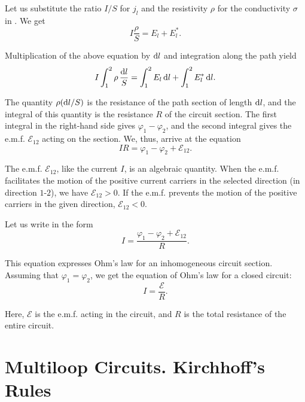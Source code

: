 Let us substitute the ratio $I/S$ for $j_l$ and the resistivity $\rho$ for the conductivity $\sigma$ in . We get
\begin{equation*}
    I \frac{\rho}{S} = E_l + E_l^*.
\end{equation*}

\noindent
Multiplication of the above equation by $\mathrm{d} l$ and integration along the path yield
\begin{equation*}
    I \int_1^2 \rho\, \frac{\mathrm{d} l}{S} = \int_1^2 E_l\, \mathrm{d} l + \int_1^2 E_l^*\, \mathrm{d} l.
\end{equation*}

\noindent
The quantity $\rho(\mathrm{d} l/S)$ is the resistance of the path section of length $\mathrm{d} l$, and the integral of this quantity is the resistance $R$ of the circuit section. The first integral in the right-hand side gives $\varphi_1-\varphi_2$, and the second integral gives the e.m.f. $\mathcal{E}_{12}$ acting on the section. We, thus, arrive at the equation
\begin{equation}\label{eq:5_27}
    I R = \varphi_1 - \varphi_2 + \mathcal{E}_{12}.
\end{equation}

The e.m.f. $\mathcal{E}_{12}$, like the current $I$, is an algebraic quantity. When the e.m.f. facilitates the motion of the positive current carriers in the selected direction (in direction $1$-$2$), we have $\mathcal{E}_{12}>0$. If the e.m.f. prevents the motion of the positive carriers in the given direction, $\mathcal{E}_{12}<0$.

Let us write  in the form
\begin{equation}\label{eq:5_28}
    I= \frac{\varphi_1 - \varphi_2 + \mathcal{E}_{12}}{R}.
\end{equation}

\noindent
This equation expresses Ohm's law for an inhomogeneous circuit section. Assuming that $\varphi_1=\varphi_2$, we get the equation of Ohm's law for a closed circuit:
\begin{equation}\label{eq:5_29}
    I= \frac{\mathcal{E}}{R}.
\end{equation}

\noindent
Here, $\mathcal{E}$ is the e.m.f. acting in the circuit, and $R$ is the total resistance of the entire circuit.

\section{Multiloop Circuits. Kirchhoff's Rules}\label{sec:5_6}

